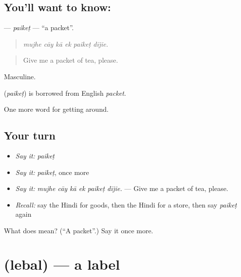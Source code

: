 \subsection*{You'll want to know: }
\textbf{} — \emph{paikeṭ} — \textquotedblleft{}a packet\textquotedblright{}.

\begin{quote}
     
\end{quote}

\begin{quote}
\emph{mujhe cāy kā ek paikeṭ dījie.}
\end{quote}

\begin{quote}
Give me a packet of tea, please.
\end{quote}

Masculine.

\begin{cousinweb}
\textbf{} (\emph{paikeṭ}) is borrowed from English \emph{packet}.
\end{cousinweb}

\begin{grammarlens}[title={What you've built}]
One more word for getting around.
\end{grammarlens}

\subsection*{Your turn}
\begin{itemize}
\raggedright
  \item \emph{Say it:} \emph{paikeṭ}
  \item \emph{Say it:} \emph{paikeṭ}, once more
  \item \emph{Say it:} \emph{mujhe cāy kā ek paikeṭ dījie.} — Give me a packet of tea, please.
  \item \emph{Recall:} say the Hindi for goods, then the Hindi for a store, then say \emph{paikeṭ} again
\end{itemize}

\begin{tcolorbox}[breakable,colback=teal!4,colframe=teal!35!black,title={Before you move on}]
What does  mean? (\textquotedblleft{}A packet\textquotedblright{}.) Say it once more.
\end{tcolorbox}
\section[\texorpdfstring{\hi{लेबल} (lebal)}{लेबल (lebal)}]{ (lebal) — a label}

